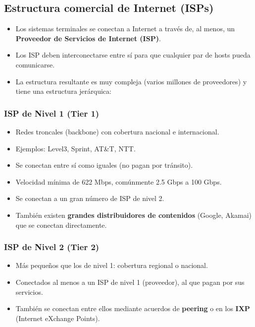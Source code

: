 \subsection{Estructura comercial de Internet (ISPs)}

\begin{itemize}
    \item Los sistemas terminales se conectan a Internet a través de, al menos, un \textbf{Proveedor de Servicios de Internet (ISP)}.
    \item Los ISP deben interconectarse entre sí para que cualquier par de hosts pueda comunicarse.
    \item La estructura resultante es muy compleja (varios millones de proveedores) y tiene una estructura jerárquica:
\end{itemize}

\subsubsection{ISP de Nivel 1 (Tier 1)}

\begin{itemize}
    \item Redes troncales (backbone) con cobertura nacional e internacional.
    \item Ejemplos: Level3, Sprint, AT\&T, NTT.
    \item Se conectan entre sí como iguales (no pagan por tránsito).
    \item Velocidad mínima de 622 Mbps, comúnmente 2.5 Gbps a 100 Gbps.
    \item Se conectan a un gran número de ISP de nivel 2.
    \item También existen \textbf{grandes distribuidores de contenidos} (Google, Akamai) que se conectan directamente.
\end{itemize}

\subsubsection{ISP de Nivel 2 (Tier 2)}

\begin{itemize}
    \item Más pequeños que los de nivel 1: cobertura regional o nacional.
    \item Conectados al menos a un ISP de nivel 1 (proveedor), al que pagan por sus servicios.
    \item También se conectan entre ellos mediante acuerdos de \textbf{peering} o en los \textbf{IXP} (Internet eXchange Points).
\end{itemize}

